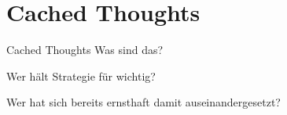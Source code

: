 

\section{Cached Thoughts}

\begin{frame}[c]{Cached Thoughts}
    \Large
    Was sind das?
\end{frame}


\begin{frame}[standout]
    Wer hält Strategie für wichtig?
\end{frame}

\begin{frame}[standout]
    \LARGE
    Wer hat sich bereits ernsthaft damit auseinandergesetzt?
\end{frame}



